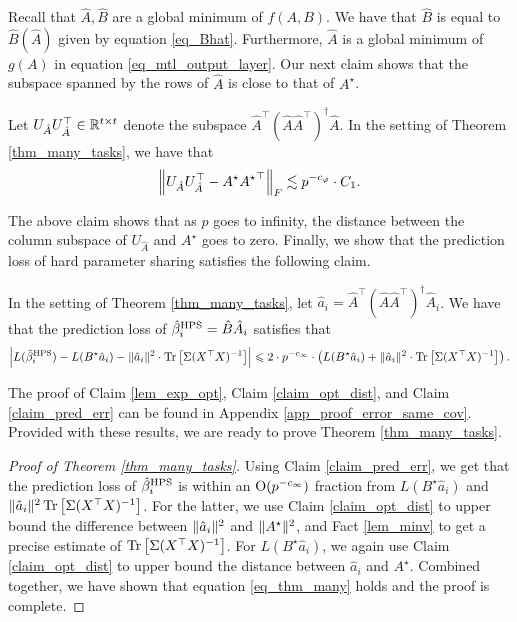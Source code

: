 	Recall that $\hat{A}, \hat{B}$ are a global minimum of $f(A, B)$.
	We have that $\hat{B}$ is equal to $\hat{B}(\hat{A})$ given by equation \eqref{eq_Bhat}.
	Furthermore, $\hat{A}$ is a global minimum of $g(A)$ in equation \eqref{eq_mtl_output_layer}.
	Our next claim shows that the subspace spanned by the rows of $\hat{A}$ is close to that of $A^{\star}$.
	\begin{claim}\label{claim_opt_dist}
		Let $U_{\hat{A}} U_{\hat{A}}^{\top} \in\mathbb{R}^{t\times t}$ denote the subspace $\hat{A}^{\top} (\hat{A}\hat{A}^{\top})^{\dagger} \hat{A}$.
		In the setting of Theorem \ref{thm_many_tasks}, we have that
		\[ \left\| U_{\hat{A}} U_{\hat{A}}^{\top} - A^{\star} {A^{\star}}^{\top} \right\|_{F}
				\lesssim p^{-c_{\varphi}} \cdot C_1. \]
	\end{claim}
	The above claim shows that as $p$ goes to infinity, the distance between the column subspace of $U_{\hat{A}}$ and ${A^{\star}}$ goes to zero.
	Finally, we show that the prediction loss of hard parameter sharing satisfies the following claim.
	\begin{claim}\label{claim_pred_err}
		In the setting of Theorem \ref{thm_many_tasks},
		let $\hat{a}_i = \hat{A}^{\top} (\hat{A}\hat{A}^{\top})^{\dagger} \hat{A}_i$.
		We have that the prediction loss of $\hat{\beta}_i^{\textup{HPS}} = \hat{B} \hat{A}_i$ satisfies that
		\begin{align*}
			{\left| {L(\hat{\beta}_i^{\textup{HPS}}) - L(B^{\star} \hat{a}_i) - \|\hat{a}_i\|^2 \cdot \operatorname{Tr}\left[\Sigma (X^{\top}X)^{-1}\right]} \right|}
			\leqslant 2\cdot p^{-c_\infty} \cdot \left({L(B^{\star} \hat{a}_i) + \|\hat{a}_i\|^2 \cdot \operatorname{Tr}\left[\Sigma (X^{\top}X)^{-1}\right]}\right).
		\end{align*}
	\end{claim}
	The proof of Claim \ref{lem_exp_opt}, Claim \ref{claim_opt_dist}, and Claim \ref{claim_pred_err} can be found in Appendix \ref{app_proof_error_same_cov}.
	Provided with these results, we are ready to prove Theorem \ref{thm_many_tasks}.
	\begin{proof}[Proof of Theorem \ref{thm_many_tasks}]
		Using Claim \ref{claim_pred_err}, we get that the prediction loss of $\hat{\beta}_i^{\textup{HPS}}$ is within an $\operatorname{O}(p^{-c_{\infty}})$ fraction from $L(B^{\star}\hat{a}_i)$ and $\|\hat{a}_i\|^2 \operatorname{Tr}\left[\Sigma(X^{\top}X)^{-1}\right]$.
		For the latter, we use Claim \ref{claim_opt_dist} to upper bound the difference between $\|\hat{a}_i\|^2$ and $\|A^{\star}\|^2$, and Fact \ref{lem_minv} to get a precise estimate of $\operatorname{Tr}\left[\Sigma (X^{\top}X)^{-1}\right]$.
		For $L(B^{\star}\hat{a}_i)$, we again use Claim \ref{claim_opt_dist} to upper bound the distance between $\hat{a}_i$ and $A^{\star}$.
		Combined together, we have shown that equation \eqref{eq_thm_many} holds and the proof is complete.
	\end{proof}

